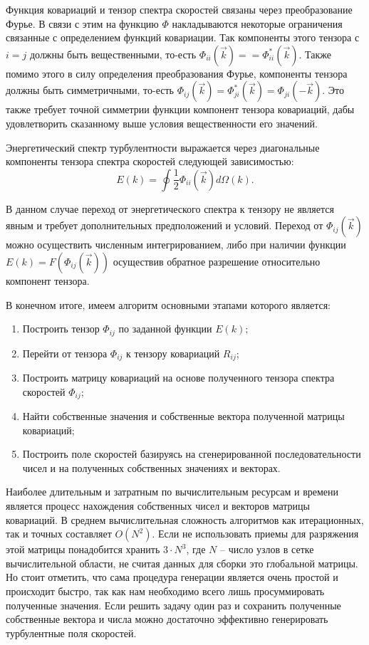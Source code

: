 Функция ковариаций и тензор спектра скоростей связаны через преобразование Фурье. В связи с этим на функцию $\Phi$ накладываются некоторые ограничения связанные с определением функций ковариации. Так компоненты этого тензора с $i=j$ должны быть вещественными, то-есть $\Phi_{ii}(\vec k) == \Phi_{ii}^{*}(\vec k)$. Также помимо этого в силу определения преобразования Фурье, компоненты тензора должны быть симметричными, то-есть $\Phi_{ij}(\vec k)=\Phi_{ji}^{*}(\vec k)=\Phi_{ji}(-\vec k)$. Это также требует точной симметрии функции компонент тензора ковариаций, дабы удовлетворить сказанному выше условия вещественности его значений. 

Энергетический спектр турбулентности выражается через диагональные компоненты тензора спектра скоростей следующей зависимостью:
\begin{equation}
    \label{eq:kriging_equation15}
    E(k) = \oint \frac{1}{2} \Phi_{ii}(\vec k) d \Omega (k).
\end{equation}

В данном случае переход от энергетического спектра к тензору не является явным и требует дополнительных предположений и условий. Переход от $\Phi_{ij}(\vec k)$ можно осуществить численным интегрированием, либо при наличии функции $E(k)=F(\Phi_{ij}(\vec k))$ осуществив обратное разрешение относительно компонент тензора.

В конечном итоге, имеем алгоритм основными этапами которого является:
\begin{enumerate}
    \item Построить тензор $\Phi_{ij}$ по заданной функции $E(k)$;
    \item Перейти от тензора $\Phi_{ij}$ к тензору ковариаций $R_{ij}$;
    \item Построить матрицу ковариаций на основе полученного тензора спектра скоростей $\Phi_{ij}$;
    \item Найти собственные значения и собственные вектора полученной матрицы ковариаций;
    \item Построить поле скоростей базируясь на сгенерированной последовательности чисел и на полученных собственных значениях и векторах.
\end{enumerate}

Наиболее длительным и затратным по вычислительным ресурсам и времени является процесс нахождения собственных чисел и векторов матрицы ковариаций. В среднем вычислительная сложность алгоритмов как итерационных, так и точных составляет $O(N^2)$. Если не использовать приемы для разряжения этой матрицы понадобится хранить $3 \cdot N^3$, где $N$ -- число узлов в сетке вычислительной области, не считая данных для сборки это глобальной матрицы. Но стоит отметить, что сама процедура генерации является очень простой и происходит быстро, так как нам необходимо всего лишь просуммировать полученные значения. Если решить задачу один раз и сохранить полученные собственные вектора и числа можно достаточно эффективно генерировать турбулентные поля скоростей.

